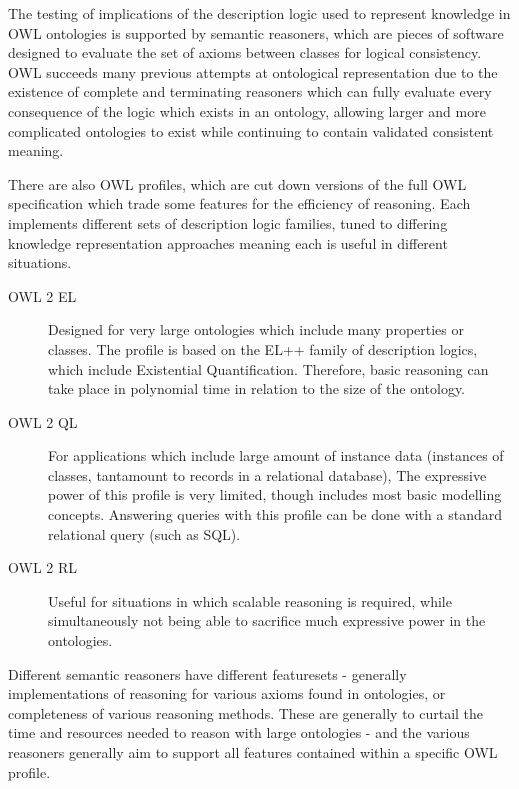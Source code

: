 \documentclass{article}
\begin{document}
The testing of implications of the description logic used to represent
knowledge in OWL ontologies is supported by semantic reasoners, which are 
pieces of software designed to evaluate the set of axioms between classes for 
logical consistency. OWL succeeds many previous attempts at ontological 
representation due to the existence of complete and terminating reasoners 
which can fully evaluate every consequence of the logic which exists in an 
ontology, allowing larger and more complicated ontologies to exist while 
continuing to contain validated consistent meaning.

There are also OWL profiles\cite{owlprofiles}, which are cut down versions of the full OWL
specification which trade some features for the efficiency of reasoning. Each
implements different sets of description logic families, tuned to differing
knowledge representation approaches meaning each is useful in different situations.

\begin{description}
    \item[OWL 2 EL] Designed for very large ontologies which include many
    properties or classes. The profile is based on the EL++ family of 
    description logics, which include Existential Quantification. Therefore,
    basic reasoning can take place in polynomial time in relation to the size of
    the ontology.
    \item[OWL 2 QL] For applications which include large amount of instance data
    (instances of classes, tantamount to records in a relational database), The
    expressive power of this profile is very limited, though includes most basic
    modelling concepts. Answering queries with this profile can be done with a
    standard relational query (such as SQL).
    \item[OWL 2 RL] Useful for situations in which scalable reasoning is
    required, while simultaneously not being able to sacrifice much expressive
    power in the ontologies.
\end{description}

Different semantic reasoners have different featuresets - generally
implementations of reasoning for various axioms found in ontologies, or
completeness of various reasoning methods. These are generally to curtail 
the time and resources needed to reason with large ontologies - and the various
reasoners generally aim to support all features contained within a specific OWL
profile\cite{reasonercompare}\cite{reasonerbenchmark}.
\end{document}
